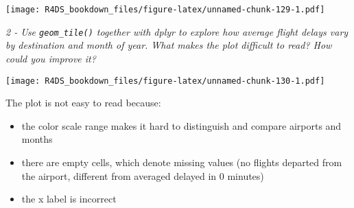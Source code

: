 \documentclass[]{article}
\newenvironment{Shaded}{\begin{snugshade}}{\end{snugshade}}
\newcommand{\KeywordTok}[1]{\textcolor[rgb]{0.13,0.29,0.53}{\textbf{#1}}}
\newcommand{\DataTypeTok}[1]{\textcolor[rgb]{0.13,0.29,0.53}{#1}}
\newcommand{\StringTok}[1]{\textcolor[rgb]{0.31,0.60,0.02}{#1}}
\newcommand{\OtherTok}[1]{\textcolor[rgb]{0.56,0.35,0.01}{#1}}
\newcommand{\OperatorTok}[1]{\textcolor[rgb]{0.81,0.36,0.00}{\textbf{#1}}}
\newcommand{\NormalTok}[1]{#1}
\providecommand{\tightlist}{%
  \setlength{\itemsep}{0pt}\setlength{\parskip}{0pt}}
\theoremstyle{definition}
\theoremstyle{definition}
\theoremstyle{definition}
\theoremstyle{remark}
\begin{document}
\begin{Shaded}
\end{Shaded}

\texttt{[image: R4DS\_bookdown\_files/figure-latex/unnamed-chunk-129-1.pdf]}

\emph{2 - Use \texttt{geom\_tile()} together with dplyr to explore how
average flight delays vary by destination and month of year. What makes
the plot difficult to read? How could you improve it?}

\begin{Shaded}
\end{Shaded}

\texttt{[image: R4DS\_bookdown\_files/figure-latex/unnamed-chunk-130-1.pdf]}

The plot is not easy to read because:

\begin{itemize}
\tightlist
\item
  the color scale range makes it hard to distinguish and compare
  airports and months
\item
  there are empty cells, which denote missing values (no flights
  departed from the airport, different from averaged delayed in 0
  minutes)
\item
  the x label is incorrect
\end{itemize}
\end{document}
